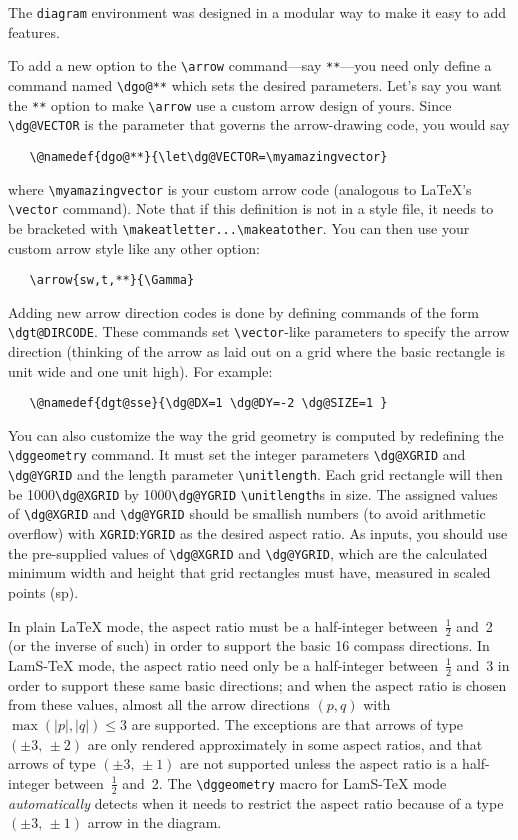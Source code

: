 \documentclass[12pt]{article}\usepackage{pb-diagram}
\def\tfrac#1#2{{\textstyle\frac{#1}{#2}}}
\begin{document}
The \verb"diagram" environment was designed in a modular way to make 
it easy to add features.

To add a new option to the \verb"\arrow" command---say 
\verb"**"---you need only define a command named \verb"\dgo@**" which 
sets the desired parameters.  Let's say you want the \verb"**" option 
to make \verb"\arrow" use a custom arrow design of yours.  Since 
\verb"\dg@VECTOR" is the parameter that governs the arrow-drawing 
code, you would say
\begin{verbatim}
   \@namedef{dgo@**}{\let\dg@VECTOR=\myamazingvector}
\end{verbatim}
where \verb"\myamazingvector" is your custom arrow code (analogous
to \LaTeX's \verb"\vector" command).  Note that if this definition is 
not in a style file, it needs to be bracketed with 
\verb"\makeatletter...\makeatother".  You can then use your custom 
arrow style like any other option:
\begin{verbatim}
   \arrow{sw,t,**}{\Gamma}
\end{verbatim}

Adding new arrow direction codes is done by defining commands of the 
form \verb"\dgt@DIRCODE".  These commands set \verb"\vector"-like 
parameters to specify the arrow direction (thinking of the arrow as 
laid out on a grid where the basic rectangle is unit wide and one 
unit high).  For example:
\begin{verbatim}
   \@namedef{dgt@sse}{\dg@DX=1 \dg@DY=-2 \dg@SIZE=1 }
\end{verbatim}

You can also customize the way the grid geometry is computed by
redefining the \verb"\dggeometry" command.  It must set 
the integer parameters \verb"\dg@XGRID" and \verb"\dg@YGRID" and
the length parameter \verb"\unitlength".  Each grid rectangle
will then be 1000\verb"\dg@XGRID" by 1000\verb"\dg@YGRID"
\verb"\unitlength"s in size.  The assigned values of
\verb"\dg@XGRID" and \verb"\dg@YGRID" should be smallish numbers
(to avoid arithmetic overflow) with \verb"XGRID":\verb"YGRID"
as the desired aspect ratio.  As inputs,
you should use the pre-supplied values of \verb"\dg@XGRID" and
\verb"\dg@YGRID", which are the calculated minimum width and
height that grid rectangles must have, measured in scaled
points (sp).

In plain \LaTeX{} mode, the aspect ratio must be a half-integer 
between~$\tfrac12$ and~2 (or the inverse of such) in order to
support the basic 16 compass directions.  In {\sc LamS}-\TeX{} mode,
the aspect ratio need only be a half-integer between~$\tfrac12$
and~3 in order to support these same basic directions; and when
the aspect ratio is chosen from these values, almost all the
arrow directions $(p,q)$ with $\max(|p|,|q|)\le 3$ are supported.
The exceptions are that arrows of type $(\pm 3,\,\pm 2)$ are
only rendered approximately in some aspect ratios, and that
arrows of type $(\pm 3,\,\pm 1)$ are not supported unless
the aspect ratio is a half-integer between~$\tfrac12$ and~2.
The \verb"\dggeometry" macro for {\sc LamS}-\TeX{} mode
{\em automatically\/} detects when it needs to restrict the
aspect ratio because of a type $(\pm 3,\,\pm 1)$ arrow in
the diagram.
\end{document}
